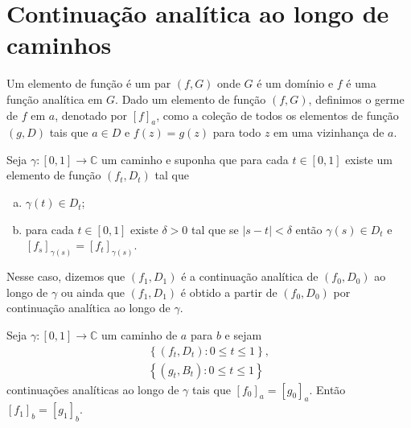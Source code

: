 \section{Continuação analítica ao longo de caminhos}


\begin{definicao}
\label{def-elemento-funcao}
Um elemento de função é um par $(f, G)$ onde $G$ é um domínio e $f$
é uma função analítica em $G$. Dado um elemento de função $(f,G)$, 
definimos o germe de $f$ em $a$, denotado por $[f]_a$, 
como a coleção de todos os elementos de função $(g,D)$ tais que 
$a\in D$ e $f(z) = g(z)$ para todo $z$ em uma vizinhança de $a$.
\end{definicao}


\begin{definicao}
\label{def-continuacao-analitica}
Seja $\gamma: [0,1] \to \mathbb{C}$ um caminho e suponha que para cada
$t\in[0,1]$ existe um elemento de função $(f_t, D_t)$ tal que
\begin{enumerate}[(a)]
    \item $\gamma(t) \in D_t$;
    \item para cada $t\in[0,1]$ existe $\delta > 0$ tal que se $|s-t| < \delta$
    então $\gamma(s) \in D_t$ e $[f_s]_{\gamma(s)} = [f_t]_{\gamma(s)}$.
\end{enumerate}
Nesse caso, dizemos que $(f_1, D_1)$ é a continuação analítica de $(f_0,D_0)$ ao 
longo de $\gamma$ ou ainda que $(f_1, D_1)$ é obtido a partir de $(f_0,D_0)$ por
continuação analítica ao longo de $\gamma$.
\end{definicao}


\begin{proposicao}
\label{prop-unicidade-continuacao-analitica-caminho}
Seja $\gamma: [0,1]\to\mathbb{C}$ um caminho de $a$ para $b$ e sejam
\begin{align*}
    \left\{ (f_t, D_t): 0\leq t\leq 1 \right\}, \\
    \left\{ (g_t, B_t): 0\leq t\leq 1 \right\}
\end{align*}
continuações analíticas ao longo de $\gamma$ tais que $[f_0]_a = [g_0]_a$.
Então $[f_1]_b = [g_1]_b$.
\end{proposicao}

